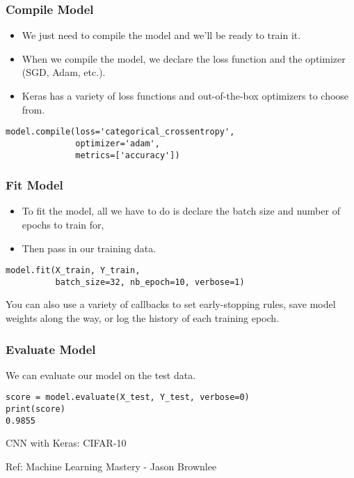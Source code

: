 \begin{frame}[fragile] \frametitle{Compile Model}

\begin{itemize}
\item We just need to compile the model and we'll be ready to train it. 
\item When we compile the model, we declare the loss function and the optimizer (SGD, Adam, etc.).
\item Keras has a variety of loss functions and out-of-the-box optimizers to choose from.
\end{itemize}
\begin{lstlisting}
model.compile(loss='categorical_crossentropy',
              optimizer='adam',
              metrics=['accuracy'])
\end{lstlisting}
\end{frame}

\begin{frame}[fragile] \frametitle{Fit Model}

\begin{itemize}
\item To fit the model, all we have to do is declare the batch size and number of epochs to train for, 
\item Then pass in our training data.
\end{itemize}
\begin{lstlisting}
model.fit(X_train, Y_train, 
          batch_size=32, nb_epoch=10, verbose=1)
\end{lstlisting}
You can also use a variety of callbacks to set early-stopping rules, save model weights along the way, or log the history of each training epoch.
\end{frame}

\begin{frame}[fragile] \frametitle{Evaluate Model}
We can evaluate our model on the test data.
\begin{lstlisting}
score = model.evaluate(X_test, Y_test, verbose=0)
print(score)
0.9855
\end{lstlisting}

\end{frame}



\begin{frame}
  \begin{center}
    {\Large CNN with Keras: CIFAR-10}
    
    {Ref: Machine Learning Mastery - Jason Brownlee}
  \end{center}
\end{frame}

